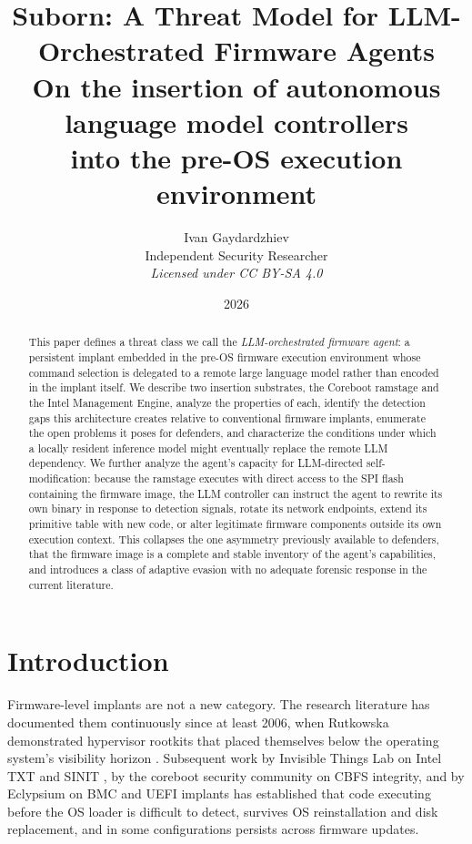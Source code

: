\documentclass[11pt,a4paper]{article}
\title{\textbf{Suborn: A Threat Model for LLM-Orchestrated Firmware Agents}\\[0.4em]
\large\normalfont On the insertion of autonomous language model controllers\\
into the pre-OS execution environment}
\author{Ivan Gaydardzhiev\\
\small Independent Security Researcher\\
\small \textit{Licensed under CC BY-SA 4.0}}
\date{2026}
\begin{document}
\maketitle

\begin{abstract}
This paper defines a threat class we call the \textit{LLM-orchestrated firmware agent}: a persistent implant embedded in the pre-OS firmware execution environment whose command selection is delegated to a remote large language model rather than encoded in the implant itself. We describe two insertion substrates, the Coreboot ramstage and the Intel Management Engine, analyze the properties of each, identify the detection gaps this architecture creates relative to conventional firmware implants, enumerate the open problems it poses for defenders, and characterize the conditions under which a locally resident inference model might eventually replace the remote LLM dependency. We further analyze the agent's capacity for LLM-directed self-modification: because the ramstage executes with direct access to the SPI flash containing the firmware image, the LLM controller can instruct the agent to rewrite its own binary in response to detection signals, rotate its network endpoints, extend its primitive table with new code, or alter legitimate firmware components outside its own execution context. This collapses the one asymmetry previously available to defenders, that the firmware image is a complete and stable inventory of the agent's capabilities, and introduces a class of adaptive evasion with no adequate forensic response in the current literature.
\end{abstract}

\tableofcontents

\newpage

\section{Introduction}

Firmware-level implants are not a new category. The research literature has documented them continuously since at least 2006, when Rutkowska demonstrated hypervisor rootkits that placed themselves below the operating system's visibility horizon \cite{bluepill}. Subsequent work by Invisible Things Lab on Intel TXT and SINIT \cite{sinit}, by the coreboot security community on CBFS integrity, and by Eclypsium on BMC and UEFI implants \cite{eclypsium} has established that code executing before the OS loader is difficult to detect, survives OS reinstallation and disk replacement, and in some configurations persists across firmware updates.
\end{document}
